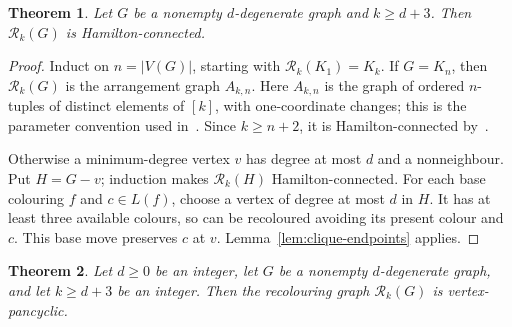 \documentclass[11pt]{article}
\newtheorem{theorem}{Theorem}[section]
\theoremstyle{remark}
\newcommand{\Rk}{\mathcal R_k}
\numberwithin{equation}{section}
\numberwithin{table}{section}
\begin{document}
\begin{theorem}\label{thm:degenerate-hc}
Let $G$ be a nonempty $d$-degenerate graph and $k\ge d+3$.
Then $\Rk(G)$ is Hamilton-connected.
\end{theorem}
\begin{proof}
Induct on $n=|V(G)|$, starting with $\Rk(K_1)=K_k$.
If $G=K_n$, then $\Rk(G)$ is the arrangement graph $A_{k,n}$.
Here $A_{k,n}$ is the graph of ordered $n$-tuples of distinct elements of
$[k]$, with one-coordinate changes; this is the parameter convention used
in~\cite{HLTH04}.  Since $k\ge n+2$, it is Hamilton-connected
by~\cite[Theorem~1]{HLTH04}.

Otherwise a minimum-degree vertex $v$ has degree at most $d$ and
a nonneighbour. Put $H=G-v$; induction makes $\Rk(H)$
Hamilton-connected. For each base colouring $f$ and $c\in L(f)$,
choose a vertex of degree at most $d$ in $H$. It has at least three
available colours, so can be recoloured avoiding its present colour
and $c$. This base move preserves $c$ at $v$.
Lemma~\ref{lem:clique-endpoints} applies.
\end{proof}

\begin{theorem}\label{thm:degenerate-vp}
Let $d\ge0$ be an integer, let $G$ be a nonempty $d$-degenerate graph,
and let $k\ge d+3$ be an integer.
Then the recolouring graph $\Rk(G)$ is vertex-pancyclic.

\end{theorem}
\end{document}
